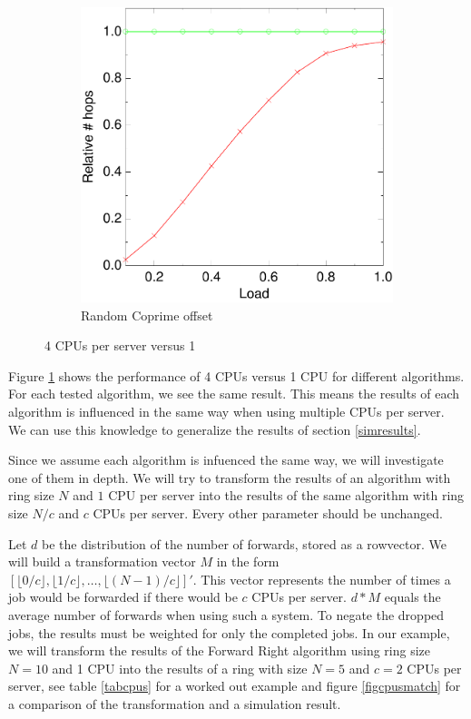 \documentclass[10pt,a4paper]{article}
\begin{document}
\begin{figure}
        \begin{subfigure}[b]{0.5\textwidth}
                \centering
                \includegraphics[width=\textwidth]{data/4randprimerandprime.pdf}
                \caption{Random Coprime offset}
        \end{subfigure}
        \caption{4 CPUs per server versus 1}\label{figcpus}
\end{figure}

Figure \ref{figcpus} shows the performance of 4 CPUs versus 1 CPU for different algorithms. For each tested algorithm, we see the same result. This means the results of each algorithm is influenced in the same way when using multiple CPUs per server. We can use this knowledge to generalize the results of section \ref{simresults}.

Since we assume each algorithm is infuenced the same way, we will investigate one of them in depth. We will try to transform the results of an algorithm with ring size $N$ and $1$ CPU per server into the results of the same algorithm with ring size $N/c$ and $c$ CPUs per server. Every other parameter should be unchanged.

Let $d$ be the distribution of the number of forwards, stored as a rowvector. We will build a transformation vector $M$ in the form $[ \lfloor 0/c \rfloor,  \lfloor 1/c \rfloor, \ldots, \lfloor (N-1)/c \rfloor]'$. This vector represents the number of times a job would be forwarded if there would be $c$ CPUs per server. $d*M$ equals the average number of forwards when using such a system. To negate the dropped jobs, the results must be weighted for only the completed jobs.
In our example, we will transform the results of the Forward Right algorithm using ring size $N=10$ and 1 CPU into the results of a ring with size $N=5$ and $c=2$ CPUs per server, see table \ref{tabcpus} for a worked out example and figure \ref{figcpusmatch} for a comparison of the transformation and a simulation result.
\end{document}
